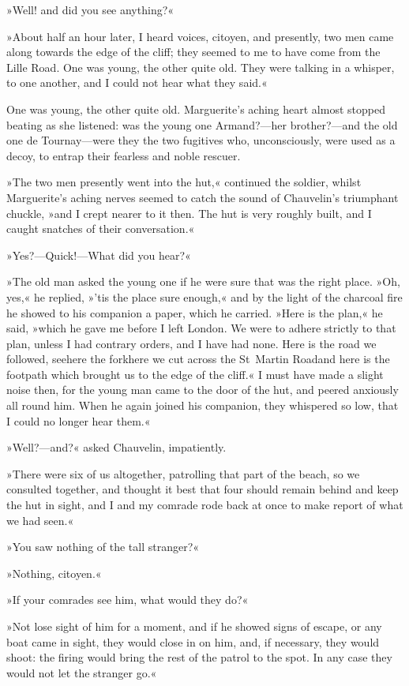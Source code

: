 »Well! and did you see anything?«

»About half an hour later, I heard voices, citoyen, and presently, two men came along towards the edge of the cliff; they seemed to me to have come from the Lille Road. One was young, the other quite old. They were talking in a whisper, to one another, and I could not hear what they said.«

One was young, the other quite old. Marguerite's aching heart almost stopped beating as she listened: was the young one Armand?—her brother?—and the old one de Tournay—were they the two fugitives who, unconsciously, were used as a decoy, to entrap their fearless and noble rescuer.

»The two men presently went into the hut,« continued the soldier, whilst Marguerite's aching nerves seemed to catch the sound of Chauvelin's triumphant chuckle, »and I crept nearer to it then. The hut is very roughly built, and I caught snatches of their conversation.«

»Yes?—Quick!—What did you hear?«

»The old man asked the young one if he were sure that was the right place. »Oh, yes,« he replied, »'tis the place sure enough,« and by the light of the charcoal fire he showed to his companion a paper, which he carried. »Here is the plan,« he said, »which he gave me before I left London. We were to adhere strictly to that plan, unless I had contrary orders, and I have had none. Here is the road we followed, see\textellipsis \allowbreak  here the fork\textellipsis \allowbreak  here we cut across the St~Martin Road\textellipsis \allowbreak  and here is the footpath which brought us to the edge of the cliff.« I must have made a slight noise then, for the young man came to the door of the hut, and peered anxiously all round him. When he again joined his companion, they whispered so low, that I could no longer hear them.«

»Well?—and?« asked Chauvelin, impatiently.

»There were six of us altogether, patrolling that part of the beach, so we consulted together, and thought it best that four should remain behind and keep the hut in sight, and I and my comrade rode back at once to make report of what we had seen.«

»You saw nothing of the tall stranger?«

»Nothing, citoyen.«

»If your comrades see him, what would they do?«

»Not lose sight of him for a moment, and if he showed signs of escape, or any boat came in sight, they would close in on him, and, if necessary, they would shoot: the firing would bring the rest of the patrol to the spot. In any case they would not let the stranger go.«

